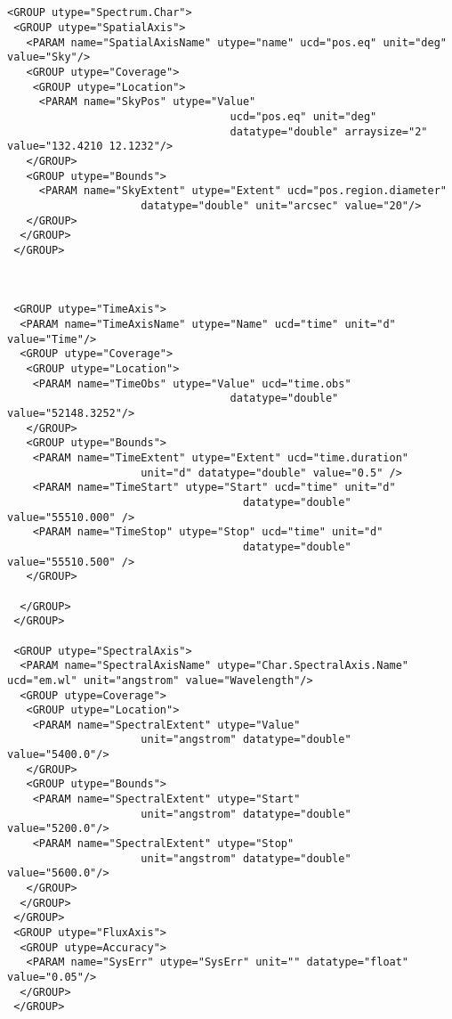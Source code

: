 {\begin{flushleft}
\begin{fmpage}
\begin{verbatim}
\end{verbatim}
\end{fmpage}

\begin{fmpage}
\begin{verbatim}


<GROUP utype="Spectrum.Char">
 <GROUP utype="SpatialAxis">
   <PARAM name="SpatialAxisName" utype="name" ucd="pos.eq" unit="deg" value="Sky"/>
   <GROUP utype="Coverage">
    <GROUP utype="Location">
     <PARAM name="SkyPos" utype="Value" 
                                   ucd="pos.eq" unit="deg" 
                                   datatype="double" arraysize="2" value="132.4210 12.1232"/>
   </GROUP>
   <GROUP utype="Bounds">
     <PARAM name="SkyExtent" utype="Extent" ucd="pos.region.diameter" 
                     datatype="double" unit="arcsec" value="20"/>
   </GROUP>
  </GROUP>
 </GROUP>



 <GROUP utype="TimeAxis">
  <PARAM name="TimeAxisName" utype="Name" ucd="time" unit="d" value="Time"/>
  <GROUP utype="Coverage">
   <GROUP utype="Location">
    <PARAM name="TimeObs" utype="Value" ucd="time.obs"
                                   datatype="double" value="52148.3252"/>
   </GROUP>
   <GROUP utype="Bounds">
    <PARAM name="TimeExtent" utype="Extent" ucd="time.duration"
                     unit="d" datatype="double" value="0.5" />
    <PARAM name="TimeStart" utype="Start" ucd="time" unit="d" 
                                     datatype="double" value="55510.000" />
    <PARAM name="TimeStop" utype="Stop" ucd="time" unit="d" 
                                     datatype="double" value="55510.500" />
   </GROUP>

  </GROUP>
 </GROUP>

 <GROUP utype="SpectralAxis">
  <PARAM name="SpectralAxisName" utype="Char.SpectralAxis.Name" ucd="em.wl" unit="angstrom" value="Wavelength"/>
  <GROUP utype=Coverage">
   <GROUP utype="Location">
    <PARAM name="SpectralExtent" utype="Value" 
                     unit="angstrom" datatype="double" value="5400.0"/>
   </GROUP>
   <GROUP utype="Bounds">
    <PARAM name="SpectralExtent" utype="Start" 
                     unit="angstrom" datatype="double" value="5200.0"/>
    <PARAM name="SpectralExtent" utype="Stop"
                     unit="angstrom" datatype="double" value="5600.0"/>
   </GROUP>
  </GROUP>
 </GROUP>
 <GROUP utype="FluxAxis">
  <GROUP utype=Accuracy">
   <PARAM name="SysErr" utype="SysErr" unit="" datatype="float" value="0.05"/>
  </GROUP>
 </GROUP>


\end{verbatim}
\end{fmpage}
\end{flushleft}}
